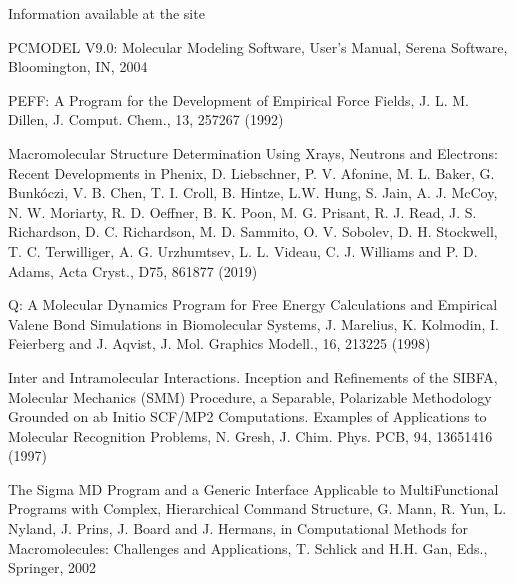\documentclass[letterpaper,11pt,english]{sphinxmanual}
\begin{document}
\sphinxAtStartPar
Information available at the site 

\sphinxAtStartPar
{}

\sphinxAtStartPar
PCMODEL V9.0: Molecular Modeling Software, User’s Manual, Serena Software, Bloomington, IN, 2004

\sphinxAtStartPar
{}

\sphinxAtStartPar
PEFF: A Program for the Development of Empirical Force Fields, J. L. M. Dillen, J. Comput. Chem., 13, 257\sphinxhyphen{}267 (1992)

\sphinxAtStartPar
{}

\sphinxAtStartPar
Macromolecular Structure Determination Using X\sphinxhyphen{}rays, Neutrons and Electrons: Recent Developments in Phenix, D. Liebschner, P. V. Afonine, M. L. Baker, G. Bunkóczi, V. B. Chen, T. I. Croll, B. Hintze, L.\sphinxhyphen{}W. Hung, S. Jain, A. J. McCoy, N. W. Moriarty, R. D. Oeffner, B. K. Poon, M. G. Prisant, R. J. Read, J. S. Richardson, D. C. Richardson, M. D. Sammito, O. V. Sobolev, D. H. Stockwell, T. C. Terwilliger, A. G. Urzhumtsev, L. L. Videau, C. J. Williams and P. D. Adams, Acta Cryst., D75, 861\sphinxhyphen{}877 (2019)

\sphinxAtStartPar
{}

\sphinxAtStartPar
Q: A Molecular Dynamics Program for Free Energy Calculations and Empirical Valene Bond Simulations in Biomolecular Systems, J. Marelius, K. Kolmodin, I. Feierberg and J. Aqvist, J. Mol. Graphics Modell., 16, 213\sphinxhyphen{}225 (1998)

\sphinxAtStartPar
{}

\sphinxAtStartPar
Inter\sphinxhyphen{} and Intramolecular Interactions. Inception and Refinements of the SIBFA, Molecular Mechanics (SMM) Procedure, a Separable, Polarizable Methodology Grounded on ab Initio SCF/MP2 Computations. Examples of Applications to Molecular Recognition Problems, N. Gresh, J. Chim. Phys. PCB, 94, 1365\sphinxhyphen{}1416 (1997)

\sphinxAtStartPar
{}

\sphinxAtStartPar
The Sigma MD Program and a Generic Interface Applicable to Multi\sphinxhyphen{}Functional Programs with Complex, Hierarchical Command Structure, G. Mann, R. Yun, L. Nyland, J. Prins, J. Board and J. Hermans, in Computational Methods for Macromolecules: Challenges and Applications, T. Schlick and H.\sphinxhyphen{}H. Gan, Eds., Springer, 2002
\end{document}
